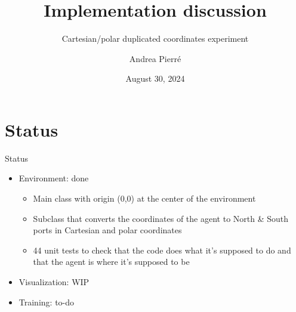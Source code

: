 \documentclass[bigger]{beamer}
\author{Andrea Pierré}
\date{August 30, 2024}
\title{Implementation discussion}
\subtitle{Cartesian/polar duplicated coordinates experiment}
\institute{Brown University}
\begin{document}
\maketitle
\section{Status}
\label{sec:org3e608ff}
\begin{frame}[label={sec:org6048ddd}]{Status}
\begin{itemize}
\item Environment: done
\begin{itemize}
\item Main class with origin (0,0) at the center of the environment
\item Subclass that converts the coordinates of the agent to North \& South ports in Cartesian and polar coordinates
\item 44 unit tests to check that the code does what it's supposed to do and that the agent is where it's supposed to be
\end{itemize}
\item Visualization: WIP
\item Training: to-do
\end{itemize}
\end{frame}
\end{document}
